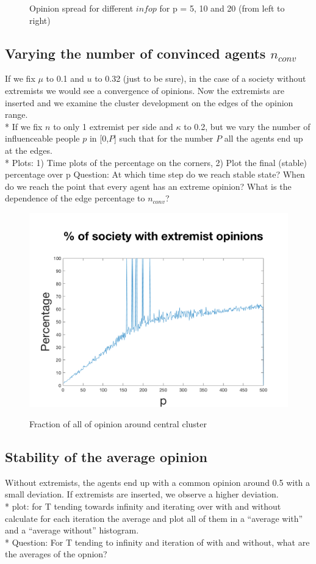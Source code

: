\documentclass[11pt]{article}
\begin{document}
\begin{figure}[!htb]
\caption{Opinion spread for different $infop$ for p = 5, 10 and 20 (from left to right)}
\label{fig:varinfop}
\end{figure}



\subsection{Varying the number of convinced agents \texorpdfstring{$n_{conv}$}{TEXT}}
If we fix $\mu$ to 0.1 and $u$ to 0.32 (just to be sure), in the case of a society without extremists we would see a convergence of opinions. Now the extremists are inserted and we examine the cluster development on the edges of the opinion range. \\*
If we fix $n$ to only 1 extremist per side and $\kappa$ to 0.2, but we vary the number of influenceable people $p$ in [0,$P$] such that for the number $P$ all the agents end up at the edges. \\*
Plots: 1) Time plots of the percentage on the corners, 2) Plot the final (stable) percentage over p
Question: At which time step do we reach stable state? When do we reach the point that every agent has an extreme opinion? What is the dependence of the edge percentage to $n_{conv}$?

\begin{figure}[!htb]
\center
\caption{Fraction of all of opinion around central cluster}
  \includegraphics[width=0.6\linewidth]{gen_plot_intervall_2017121713504989561e+01.png}
  \label{fig:varymu}
\end{figure}

\subsection{Stability of the average opinion}
Without extremists, the agents end up with a common opinion around 0.5 with a small deviation. If extremists are inserted, we observe a higher deviation. \\*
plot: for T tending towards infinity and iterating over with and without calculate for each iteration the average and plot all of them in a “average with” and a “average without” histogram. \\*
Question: For T tending to infinity and iteration of with and without, what are the averages of the opnion?
\end{document}

